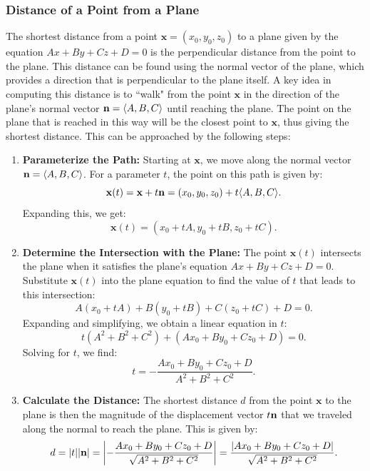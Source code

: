 \subsubsection*{Distance of a Point from a Plane}

\noindent The shortest distance from a point \( \mathbf{x} = (x_0, y_0, z_0) \) to a plane given by the equation \( Ax + By + Cz + D = 0 \) is the perpendicular distance from the point to the plane. This distance can be found using the normal vector of the plane, which provides a direction that is perpendicular to the plane itself. A key idea in computing this distance is to ``walk" from the point \( \mathbf{x} \) in the direction of the plane's normal vector \( \vb{n} = \langle A, B, C \rangle \) until reaching the plane. The point on the plane that is reached in this way will be the closest point to \( \mathbf{x} \), thus giving the shortest distance. This can be approached by the following steps:

\begin{enumerate}
    \item \textbf{Parameterize the Path:} Starting at \( \mathbf{x} \), we move along the normal vector \( \vb{n} = \langle A, B, C \rangle \). For a parameter \( t \), the point on this path is given by:
    \[
    \mathbf{x}(t) = \mathbf{x} + t \vb{n} = (x_0, y_0, z_0) + t \langle A, B, C \rangle.
    \]
    Expanding this, we get:
    \[
    \mathbf{x}(t) = (x_0 + tA, y_0 + tB, z_0 + tC).
    \]

    \item \textbf{Determine the Intersection with the Plane:} The point \( \mathbf{x}(t) \) intersects the plane when it satisfies the plane's equation \( Ax + By + Cz + D = 0 \). Substitute \( \mathbf{x}(t) \) into the plane equation to find the value of \( t \) that leads to this intersection:
    \[
    A(x_0 + tA) + B(y_0 + tB) + C(z_0 + tC) + D = 0.
    \]
    Expanding and simplifying, we obtain a linear equation in \( t \):
    \[
    t (A^2 + B^2 + C^2) + (Ax_0 + By_0 + Cz_0 + D) = 0.
    \]
    Solving for \( t \), we find:
    \[
    t = -\frac{Ax_0 + By_0 + Cz_0 + D}{A^2 + B^2 + C^2}.
    \]

    \item \textbf{Calculate the Distance:} The shortest distance \( d \) from the point \( \mathbf{x} \) to the plane is then the magnitude of the displacement vector \( t \vb{n} \) that we traveled along the normal to reach the plane. This is given by:
    \[
    d = |t| |\vb{n}| = \left| -\frac{Ax_0 + By_0 + Cz_0 + D}{\sqrt{A^2 + B^2 + C^2}} \right| = \frac{|Ax_0 + By_0 + Cz_0 + D|}{\sqrt{A^2 + B^2 + C^2}}.
    \]
\end{enumerate}

